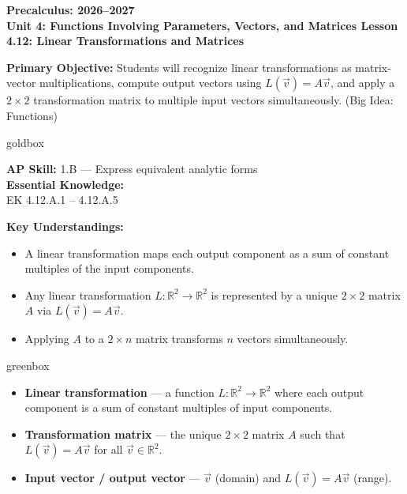 \documentclass[10pt]{article}
\newcommand{\CourseName}{Precalculus}
\newcommand{\SchoolYear}{2026--2027}
\newcommand{\UnitNumberName}{Unit 4: Functions Involving Parameters, Vectors, and Matrices \quad}
\newcommand{\LessonNumberName}{Lesson 4.12: Linear Transformations and Matrices}
\begin{document}
\begin{center}
    {\Large\bfseries \CourseName: \SchoolYear \\
    {\small\bfseries \UnitNumberName \LessonNumberName}}
\end{center}

\begin{tcolorbox}[colback=sky, colframe=navy, boxrule=0.9pt, arc=2mm,
    left=2mm, right=2mm, top=1.5mm, bottom=1.5mm]
    \textbf{Primary Objective:} Students will recognize linear transformations as
    matrix-vector multiplications, compute output vectors using $L(\vec{v}) = A\vec{v}$,
    and apply a $2\times 2$ transformation matrix to multiple input vectors simultaneously.
    (Big Idea: Functions)
\end{tcolorbox}

\renewcommand{\arraystretch}{1.6}
\begin{skillbox}{goldbox}
\begin{minipage}[t]{0.46\linewidth}\vspace{0pt}
    \textbf{AP Skill:} 1.B --- Express equivalent analytic forms\\[4pt]
    \textbf{Essential Knowledge:}\\
    EK 4.12.A.1 -- 4.12.A.5
\end{minipage}
\hfill
\begin{minipage}[t]{0.50\linewidth}\vspace{0pt}
    \textbf{Key Understandings:}
    \begin{itemize}[leftmargin=1.2em, itemsep=1pt]
        \item A linear transformation maps each output component as a sum of constant
              multiples of the input components.
        \item Any linear transformation $L:\mathbb{R}^2\to\mathbb{R}^2$ is represented
              by a unique $2\times 2$ matrix $A$ via $L(\vec{v})=A\vec{v}$.
        \item Applying $A$ to a $2\times n$ matrix transforms $n$ vectors simultaneously.
    \end{itemize}
\end{minipage}
\end{skillbox}

\begin{skillbox}{greenbox}
\begin{itemize}[leftmargin=1.2em, itemsep=2pt]
    \item \textbf{Linear transformation} --- a function $L:\mathbb{R}^2\to\mathbb{R}^2$
          where each output component is a sum of constant multiples of input components.
    \item \textbf{Transformation matrix} --- the unique $2\times 2$ matrix $A$ such that
          $L(\vec{v})=A\vec{v}$ for all $\vec{v}\in\mathbb{R}^2$.
    \item \textbf{Input vector / output vector} --- $\vec{v}$ (domain) and $L(\vec{v})=A\vec{v}$
          (range).
\end{itemize}
\end{skillbox}
\end{document}
